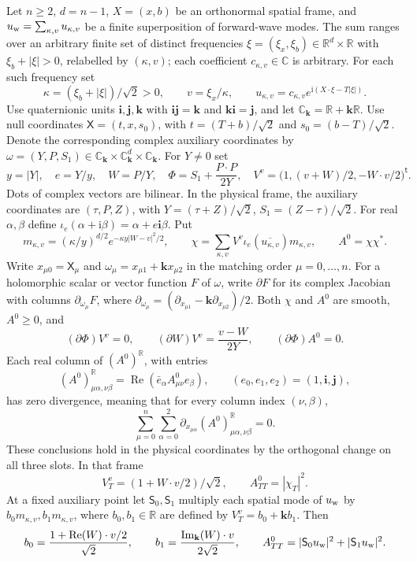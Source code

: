 Let $n\ge2$, $d=n-1$, $X=(x,b)$ be an orthonormal spatial frame, and $u_{\rm w}=\sum_{\kappa,v}u_{\kappa,v}$ be a finite superposition of forward-wave modes. The sum ranges over an arbitrary finite set of distinct frequencies $\xi=(\xi_x,\xi_b)\in\mathbb R^d\times\mathbb R$ with $\xi_b+|\xi|>0$, relabelled by $(\kappa,v)$; each coefficient $c_{\kappa,v}\in\mathbb C$ is arbitrary. For each such frequency set
\[
\kappa=(\xi_b+|\xi|)/\sqrt2>0,\qquad v=\xi_x/\kappa,\qquad
u_{\kappa,v}=c_{\kappa,v}e^{\mathrm i(X\cdot\xi-T|\xi|)}.
\]
Use quaternionic units $\mathbf i,\mathbf j,\mathbf k$ with $\mathbf{ij}=\mathbf k$ and $\mathbf{ki}=\mathbf j$, and let $\mathbb C_{\mathbf k}=\mathbb R+\mathbf k\mathbb R$. Use null coordinates $\mathsf X=(t,x,s_0)$, with $t=(T+b)/\sqrt2$ and $s_0=(b-T)/\sqrt2$. Denote the corresponding complex auxiliary coordinates by $\omega=(Y,P,S_1)\in\mathbb C_{\mathbf k}\times\mathbb C_{\mathbf k}^d\times\mathbb C_{\mathbf k}$. For $Y\ne0$ set
\[
y=|Y|,\quad e=Y/y,\quad W=P/Y,\quad
\Phi=S_1+\frac{P\cdot P}{2Y},\quad
V^v=\bigl(1,(v+W)/2,-W\cdot v/2\bigr)^{\mathsf t}.
\]
Dots of complex vectors are bilinear. In the physical frame, the auxiliary coordinates are $(\tau,P,Z)$, with $Y=(\tau+Z)/\sqrt2$, $S_1=(Z-\tau)/\sqrt2$. For real $\alpha,\beta$ define $\iota_e(\alpha+\mathrm i\beta)=\alpha+e\mathbf i\beta$. Put
\[
m_{\kappa,v}=(\kappa/y)^{d/2}e^{-\kappa y|W-v|^2/2},\qquad
\chi=\sum_{\kappa,v} V^v\iota_e(\overline{u_{\kappa,v}})m_{\kappa,v},\qquad A^0=\chi\chi^* .
\]
Write $x_{\mu0}=\mathsf X_\mu$ and $\omega_\mu=x_{\mu1}+\mathbf kx_{\mu2}$ in the matching order $\mu=0,\ldots,n$. For a holomorphic scalar or vector function $F$ of $\omega$, write $\partial F$ for its complex Jacobian with columns $\partial_{\omega_\mu}F$, where $\partial_{\omega_\mu}=(\partial_{x_{\mu1}}-\mathbf k\partial_{x_{\mu2}})/2$. Both $\chi$ and $A^0$ are smooth, $A^0\ge0$, and
\[
(\partial\Phi)V^v=0,\qquad
(\partial W)V^v=\frac{v-W}{2Y},\qquad
(\partial\Phi)A^0=0 .
\]
Each real column of $(A^0)^\mathbb R$, with entries
\[
(A^0)^\mathbb R_{\mu\alpha,\nu\beta}=\operatorname{Re}(\bar e_\alpha A^0_{\mu\nu}e_\beta),
\qquad (e_0,e_1,e_2)=(1,\mathbf i,\mathbf j),
\]
has zero divergence, meaning that for every column index $(\nu,\beta)$,
\[
 \sum_{\mu=0}^n\sum_{\alpha=0}^2
 \partial_{x_{\mu\alpha}}(A^0)^\mathbb R_{\mu\alpha,\nu\beta}=0.
\]
These conclusions hold in the physical coordinates by the orthogonal change on all three slots. In that frame
\[
V_T^v=(1+W\cdot v/2)/\sqrt2,\qquad A^0_{TT}=|\chi_T|^2.
\]
At a fixed auxiliary point let $\mathsf S_0,\mathsf S_1$ multiply each spatial mode of $u_{\rm w}$ by $b_0m_{\kappa,v},b_1m_{\kappa,v}$, where $b_0,b_1\in\mathbb R$ are defined by $V_T^v=b_0+\mathbf k b_1$. Then
\[
b_0=\frac{1+\operatorname{Re}(W)\cdot v/2}{\sqrt2},
\qquad
b_1=\frac{\operatorname{Im}_{\mathbf k}(W)\cdot v}{2\sqrt2},
\qquad A^0_{TT}=|\mathsf S_0u_{\rm w}|^2+|\mathsf S_1u_{\rm w}|^2.
\]
